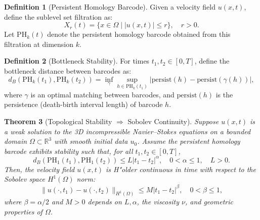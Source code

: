 \documentclass[11pt]{article}
\newtheorem{theorem}{Theorem}[section]
\theoremstyle{definition}
\newtheorem{definition}[theorem]{Definition}
\begin{document}
\begin{definition}[Persistent Homology Barcode]
Given a velocity field $u(x,t)$, define the sublevel set filtration as:
\[
X_r(t) = \{x \in \Omega \mid |u(x,t)| \leq r \}, \quad r > 0.
\]
Let $\mathrm{PH}_k(t)$ denote the persistent homology barcode obtained from this filtration at dimension $k$.
\end{definition}

\begin{definition}[Bottleneck Stability]
For times $t_1, t_2 \in [0,T]$, define the bottleneck distance between barcodes as:
\[
d_B(\mathrm{PH}_k(t_1), \mathrm{PH}_k(t_2)) = \inf_{\gamma} \sup_{h \in \mathrm{PH}_k(t_1)}|\mathrm{persist}(h)-\mathrm{persist}(\gamma(h))|,
\]
where $\gamma$ is an optimal matching between barcodes, and $\mathrm{persist}(h)$ is the persistence (death-birth interval length) of barcode $h$.
\end{definition}

\begin{theorem}[Topological Stability $\Rightarrow$ Sobolev Continuity]
\label{thm:topological_sobolev_continuity}
Suppose $u(x,t)$ is a weak solution to the 3D incompressible Navier--Stokes equations on a bounded domain $\Omega \subset \mathbb{R}^3$ with smooth initial data $u_0$. Assume the persistent homology barcode exhibits stability such that, for all $t_1,t_2\in[0,T]$,
\[
d_B(\mathrm{PH}_1(t_1), \mathrm{PH}_1(t_2)) \leq L|t_1-t_2|^{\alpha}, \quad 0 < \alpha \leq 1, \quad L > 0.
\]
Then, the velocity field $u(x,t)$ is H"older continuous in time with respect to the Sobolev space $H^1(\Omega)$ norm:
\[
\|u(\cdot,t_1)-u(\cdot,t_2)\|_{H^1(\Omega)} \leq M|t_1-t_2|^{\beta}, \quad 0<\beta\leq 1,
\]
where $\beta = \alpha/2$ and $M > 0$ depends on $L, \alpha$, the viscosity $\nu$, and geometric properties of $\Omega$.
\end{theorem}
\end{document}
